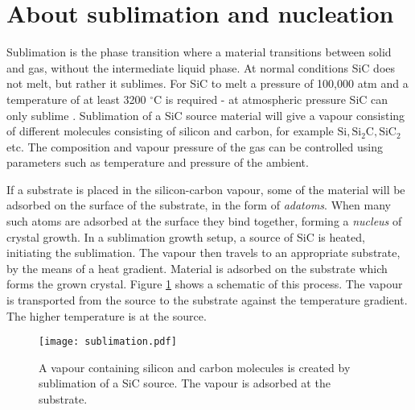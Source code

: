  \section{About sublimation and nucleation}
 \label{sec:growth:sub_nuc}
 Sublimation is the phase transition where a material transitions between solid and gas, without the intermediate liquid phase. At normal conditions SiC does not melt, but rather it sublimes. For SiC to melt a pressure of 100,000 atm and a temperature of at least 3200 $^\circ$C is required - at atmospheric pressure SiC can only sublime \cite{Scheel2003}. Sublimation of a SiC source material will give a vapour consisting of different molecules consisting of silicon and carbon, for example $\mathrm{Si, Si_2C, SiC_2}$ etc. The composition and vapour pressure of the gas can be controlled using parameters such as temperature and pressure of the ambient. 
 
If a substrate is placed in the silicon-carbon vapour, some of the material will be adsorbed on the surface of the substrate, in the form of \emph{adatoms}. When many such atoms are adsorbed at the surface they bind together, forming a \emph{nucleus} of crystal growth. In a sublimation growth setup, a source of SiC is heated, initiating the sublimation. The vapour then travels to an appropriate substrate, by the means of a heat gradient. Material is adsorbed on the substrate which forms the grown crystal. Figure \ref{fig:sublimation} shows a schematic of this process. The vapour is transported from the source to the substrate against the temperature gradient. The higher temperature is at the source. 

\begin{figure}[h]
\begin{center}
\texttt{[image: sublimation.pdf]}
\caption{A vapour containing silicon and carbon molecules is created by sublimation of a SiC source. The vapour is adsorbed at the substrate. 
\label{fig:sublimation}}
\end{center}
\end{figure}
 
